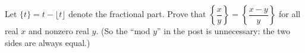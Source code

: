 Let $\{t\}=t-\lfloor t\rfloor$ denote the fractional part. Prove that $\left\{\dfrac xy\right\}=\left\{\dfrac{x-y}y\right\}$ for all real $x$ and nonzero real $y$. (So the ``mod $y$'' in the post is unnecessary: the two sides are always equal.)
